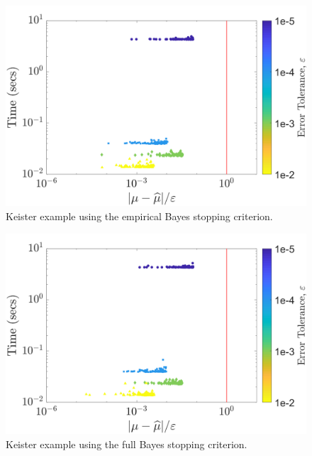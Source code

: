 \documentclass[twocolumn]{svjour3}          %
\begin{document}
\begin{figure}
	\centering
	\includegraphics[width=0.95\linewidth]{"Keister_guaranteed_time_MLE_C1sin_d4_r2_2018-Sep-6"}
	\caption[Keister guaranteed:MLE]{Keister example using the empirical Bayes stopping criterion.}
	\label{fig:keister-guaranteed-MLE}
\end{figure}
\begin{figure}
	\centering
	\includegraphics[width=0.95\linewidth]{"Keister_guaranteed_time_full_C1sin_d4_r2_2018-Sep-6"}
	\caption[Keister guaranteed:FB]{Keister example using the full Bayes stopping criterion.}
	\label{fig:keister-guaranteed-FB}
\end{figure}
\end{document}
